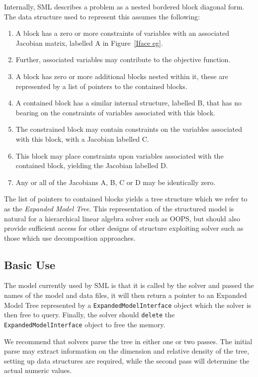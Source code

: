\documentclass[10pt,a4paper]{report}
\begin{document}
Internally, SML describes a problem as a nested bordered block diagonal form.
The data structure used to represent this assumes the following:
\begin{enumerate}
   \item A block has a zero or more constraints of variables with an associated
      Jacobian matrix, labelled A in Figure~\ref{Iface eg}.
   \item Further, associated variables may contribute to the objective function.
   \item A block has zero or more additional blocks nested within it, these are
      represented by a list of pointers to the contained blocks.
   \item A contained block has a similar internal structure, labelled B, that
      has no bearing on the constraints of variables associated with this block.
   \item The constrained block may contain constraints on the variables
      associated with this block, with a Jacobian labelled C.
   \item This block may place constraints upon variables associated with
      the contained block, yielding the Jacobian labelled D.
   \item Any or all of the Jacobians A, B, C or D may be identically zero.
\end{enumerate}

The list of pointers to contained blocks yields a tree structure which
we refer to as the {\em Expanded Model Tree}. This representation of the structured
model is natural for a hierarchical linear algebra solver such as OOPS, but
should also provide sufficient access for other designs of structure exploiting
solver such as those which use decomposition approaches.

\subsection{Basic Use}

The model currently used by SML is that it is called by the solver and passed
the names of the model and data files, it will then return a pointer to an
Expanded Model Tree represented by a {\tt ExpandedModelInterface} object which
the solver is then free to query. Finally, the solver should {\tt delete} the
{\tt ExpandedModelInterface} object to free the memory.

We recommend that solvers parse the tree in either one or two passes. The
initial parse may extract information on the dimension and relative density of
the tree, setting up data structures are required, while the second pass will
determine the actual numeric values.
\end{document}
